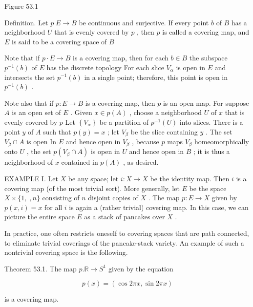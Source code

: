 \documentclass[10pt]{article}
\begin{document}
Figure 53.1

Definition. Let \(p\;E \rightarrow  B\) be continuous and surjective. If every point \(b\) of \(B\) has a neighborhood \(U\) that is evenly covered by \(p\) , then \(p\) is called a covering map, and \(E\) is said to be a covering space of \(B\)

Note that if \(p \cdot  E \rightarrow  B\) is a covering map, then for each \(b \in  B\) the subspace \({p}^{-1}\left( b\right)\) of \(E\) has the discrete topology For each slice \({V}_{\alpha }\) is open in \(E\) and intersects the set \({p}^{-1}\left( b\right)\) in a single point; therefore, this point is open in \({p}^{-1}\left( b\right)\) .

Note also that if \(p : E \rightarrow  B\) is a covering map, then \(p\) is an open map. For suppose \(A\) is an open set of \(E\) . Given \(x \in  p\left( A\right)\) , choose a neighborhood \(U\) of \(x\) that is evenly covered by \(p\) Let \(\left\{  {V}_{\alpha }\right\}\) be a partition of \({p}^{-1}\left( U\right)\) into slices. There is a point \(y\) of \(A\) such that \(p\left( y\right)  = x\) ; let \({V}_{\beta }\) be the slice containing \(y\) . The set \({V}_{\beta } \cap  A\) is open In \(E\) and hence open in \({V}_{\beta }\) , because \(p\) maps \({V}_{\beta }\) homeomorphically onto \(U\) , the set \(p\left( {{V}_{\beta } \cap  A}\right)\) is open in \(U\) and hence open in \(B\) ; it is thus a neighborhood of \(x\) contained in \(p\left( A\right)\) , as desired.

EXAMPLE I. Let \(X\) be any space; let \(i : X \rightarrow  X\) be the identity map. Then \(i\) is a covering map (of the most trivial sort). More generally, let \(E\) be the space \(X \times  \{ 1,\;,n\}\) consisting of \(n\) disjoint copies of \(X\) . The map \(p : E \rightarrow  X\) given by \(p\left( {x,i}\right)  = x\) for all \(i\) is again a (rather trivial) covering map. In this case, we can picture the entire space \(E\) as a stack of pancakes over \(X\) .

In practice, one often restricts oneself to covering spaces that are path connected, to eliminate trivial coverings of the pancake-stack variety. An example of such a nontrivial covering space is the following.

Theorem 53.1. The map \(p.\mathbb{R} \rightarrow  {S}^{1}\) given by the equation

\[
p\left( x\right)  = \left( {\cos {2\pi x},\sin {2\pi x}}\right)
\]

is a covering map.
\end{document}
